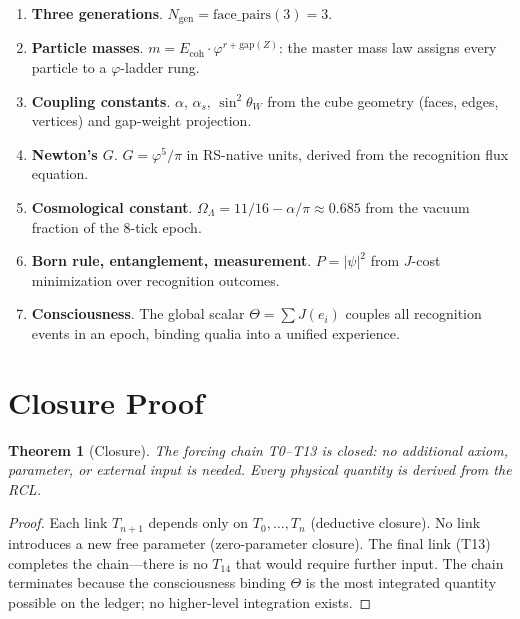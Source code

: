 \documentclass[12pt,a4paper]{article}
\newtheorem{theorem}{Theorem}[section]
\theoremstyle{definition}
\theoremstyle{remark}
\begin{document}
\begin{enumerate}[label=\textbf{T\arabic*}., leftmargin=2cm]
  \item \textbf{Three generations}.
  $N_{\mathrm{gen}} = \mathrm{face\_pairs}(3) = 3$.

  \item \textbf{Particle masses}.
  $m = E_{\mathrm{coh}} \cdot \varphi^{r + \mathrm{gap}(Z)}$:
  the master mass law assigns every particle to a
  $\varphi$-ladder rung.

  \item \textbf{Coupling constants}.
  $\alpha$, $\alpha_s$, $\sin^2\theta_W$ from the cube geometry
  (faces, edges, vertices) and gap-weight projection.

  \item \textbf{Newton's $G$}.
  $G = \varphi^5/\pi$ in RS-native units, derived from the
  recognition flux equation.

  \item \textbf{Cosmological constant}.
  $\Omega_\Lambda = 11/16 - \alpha/\pi \approx 0.685$ from the
  vacuum fraction of the 8-tick epoch.

  \item \textbf{Born rule, entanglement, measurement}.
  $P = |\psi|^2$ from $J$-cost minimization over recognition
  outcomes.

  \item \textbf{Consciousness}.
  The global scalar $\Theta = \sum J(e_i)$ couples all
  recognition events in an epoch, binding qualia into a unified
  experience.
\end{enumerate}

\section{Closure Proof}
\label{sec:closure}

\begin{theorem}[Closure]
\label{thm:closure}
The forcing chain T0--T13 is closed: no additional axiom, parameter,
or external input is needed.  Every physical quantity is derived from
the RCL.
\end{theorem}

\begin{proof}
Each link $T_{n+1}$ depends only on $T_0, \ldots, T_n$ (deductive
closure).  No link introduces a new free parameter (zero-parameter
closure).  The final link (T13) completes the chain---there is no
$T_{14}$ that would require further input.  The chain terminates
because the consciousness binding $\Theta$ is the most integrated
quantity possible on the ledger; no higher-level integration exists.
\end{proof}
\end{document}
